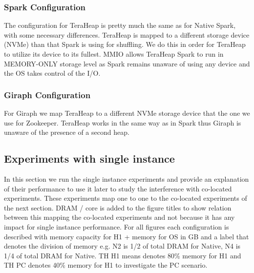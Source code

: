 \subsubsection{Spark Configuration}
The configuration for TeraHeap is pretty much the same as for Native
Spark, with some necessary differences. TeraHeap
is mapped to a different storage device (NVMe) than that Spark is
using for shuffling. We do this in order for TeraHeap to utilize its
device to its fullest. MMIO allows TeraHeap Spark to run in
MEMORY-ONLY storage level as Spark remains unaware of using any device and
the OS takes control of the I/O.

\subsubsection{Giraph Configuration}
For Giraph we map TeraHeap to a different NVMe storage device that the one we
use for Zookeeper. TeraHeap works in the same way as in Spark
thus Giraph is unaware of the presence of a second heap.

\subsection{Experiments with single instance}

In this section we run the single instance experiments and provide an explanation of their performance to use it later to study the interference with co-located experiments.
These experiments map one to one to the co-located experiments of the next section.
DRAM / core is added to the figure titles to show relation between this mapping the co-located experiments and not because it has any impact
for single instance performance. For all figures each configuration is described with memory capacity for H1 + memory for OS in GB and a label that denotes the division of memory e.g. N2 is 1/2 of total DRAM for Native, N4 is 1/4 of total DRAM for Native. TH H1 means denotes 80\% memory for H1 and TH PC denotes 40\% memory for H1 to investigate the PC scenario.

